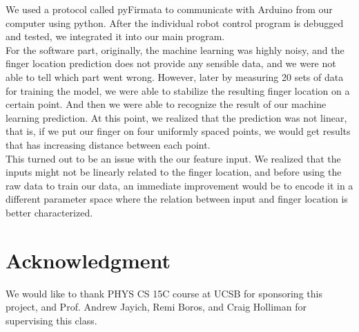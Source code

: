 \documentclass[reprint,amsmath, amsfonts, amssymb, aps, letterpaper]{revtex4-1}
\begin{document}
We used a protocol called pyFirmata to communicate with Arduino from our computer using python. After the individual robot control program is debugged and tested, we integrated it into our main program.
\\\indent For the software part, originally, the machine learning was highly noisy, and the finger location prediction does not provide any sensible data, and we were not able to tell which part went wrong. However, later by measuring 20 sets of data for training the model, we were able to stabilize the resulting finger location on a certain point. And then we were able to recognize the result of our machine learning prediction. At this point, we realized that the prediction was not linear, that is, if we put our finger on four uniformly spaced points, we would get results that has increasing distance between each point. 
\\\indent This turned out to be an issue with the our feature input. We realized that the inputs might not be linearly related to the finger location, and before using the raw data to train our data, an immediate improvement would be to encode it in a different parameter space where the relation between input and finger location is better characterized.

\section{Acknowledgment}
We would like to thank PHYS CS 15C course at UCSB for sponsoring this project, and Prof. Andrew Jayich, Remi Boros, and Craig Holliman for supervising this class.

\nocite{*}
\end{document}
